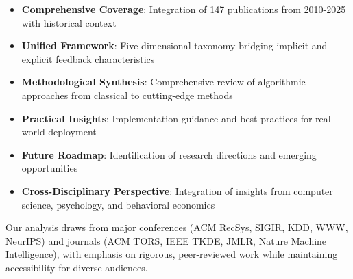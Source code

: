 \begin{itemize}
    \item \textbf{Comprehensive Coverage}: Integration of 147 publications from 2010-2025 with historical context
    \item \textbf{Unified Framework}: Five-dimensional taxonomy bridging implicit and explicit feedback characteristics
    \item \textbf{Methodological Synthesis}: Comprehensive review of algorithmic approaches from classical to cutting-edge methods
    \item \textbf{Practical Insights}: Implementation guidance and best practices for real-world deployment
    \item \textbf{Future Roadmap}: Identification of research directions and emerging opportunities
    \item \textbf{Cross-Disciplinary Perspective}: Integration of insights from computer science, psychology, and behavioral economics
\end{itemize}

Our analysis draws from major conferences (ACM RecSys, SIGIR, KDD, WWW, NeurIPS) and journals (ACM TORS, IEEE TKDE, JMLR, Nature Machine Intelligence), with emphasis on rigorous, peer-reviewed work while maintaining accessibility for diverse audiences.